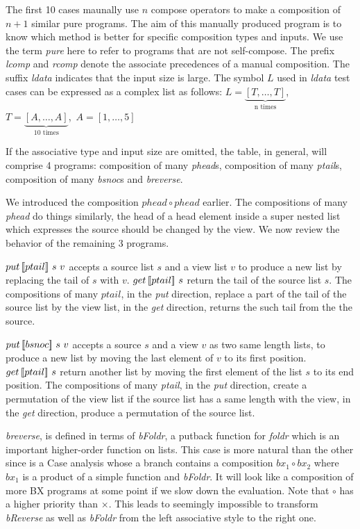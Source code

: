 The first 10 cases maunally use $n$ compose operators to make a composition of $n + 1$ similar pure programs.
The aim of this manually produced program is to know which method is better for specific composition types and inputs.
We use the term \textit{pure} here to refer to programs that are not self-compose. The prefix \textit{lcomp} and \textit{rcomp} denote the associate precedences of a manual composition. The suffix \textit{ldata} indicates that the input size is large. The symbol $L$ used in \textit{ldata} test cases can be expressed as a complex list as follows: $L = \underbrace{[T,\ldots,T]}_{\text{n times}}$,\ $T = \underbrace{[A,\ldots,A]}_{\text{10 times}}$,\ $A = [1,\ldots,5]$

If the associative type and input size are omitted, the table, in general, will comprise 4 programs: composition of many \textit{phead}s, composition of many \textit{ptail}s, composition of many \textit{bsnoc}s and \textit{breverse}.

We introduced the composition $phead \circ phead$ earlier. The compositions of many \textit{phead} do things similarly, the head of a head element inside a super nested list which expresses the source should be changed by the view. We now review the behavior of the remaining 3 programs.

\tab $put \, [\![ptail]\!] \ s \ v$ accepts a source list $s$ and a view list $v$ to produce a new list by replacing the tail of $s$ with $v$. $get \, [\![ptail]\!] \ s$ return the tail of the source list $s$. The compositions of many $ptail$, in the \textit{put} direction, replace a part of the tail of the source list by the view list, in the \textit{get} direction, returns the such tail from the the source.

\tab $put \, [\![bsnoc]\!] \ s \ v$ accepts a source $s$ and a view $v$ as two same length lists, to produce a new list by moving the last element of $v$ to its first position. $get \, [\![ptail]\!] \ s$ return another list by moving the first element of the list $s$ to its end position. The compositions of many \textit{ptail}, in the \textit{put} direction, create a permutation of the view list if the source list has a same length with the view, in the \textit{get} direction, produce a permutation of the source list.

\tab \textit{breverse}, is defined in terms of \textit{bFoldr}, a putback function for \textit{foldr} which is an important higher-order function on lists. This case is more natural than the other since  is a Case analysis whose a branch contains a composition $bx_1 \circ bx_2$ where $bx_1$ is a product of a simple function and \textit{bFoldr}. It will look like a composition of more BX programs at some point if we slow down the evaluation. Note that $\circ$ has a higher priority than $\times$. This leads to seemingly impossible to transform \textit{bReverse} as well as \textit{bFoldr} from the left associative style to the right one.


